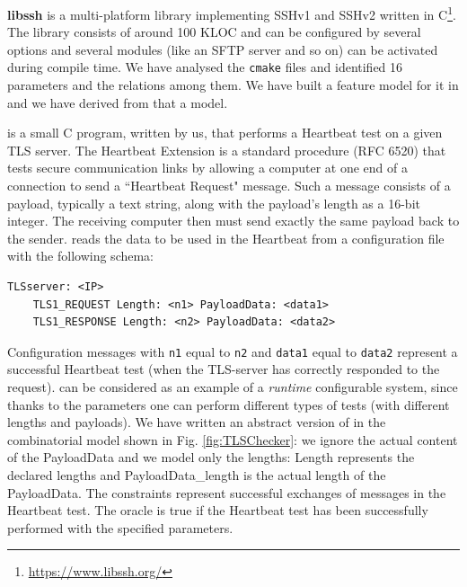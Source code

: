 \begin{tikzborder}{\cite{Gargantini16:validation}}
\begin{asparaenum}
		\item \textbf{libssh} is a multi-platform library implementing SSHv1 and SSHv2 written in C\footnote{\url{https://www.libssh.org/}}. The library consists of around 100 KLOC and can be configured by several options and several modules (like an SFTP server and so on) can be activated during compile time. We have analysed the \texttt{cmake} files and identified 16 parameters and the relations among them. We have built a feature model for it in \cite{icst2016} and we have derived from that a \citlab model.
		\item \textbf{\TLSChecker} is a small C program, written by us, that performs a Heartbeat test on a given TLS server. 
		The Heartbeat Extension is a standard procedure (RFC 6520) that tests secure communication links by allowing a computer at one end of a connection to send a ``Heartbeat Request" message. Such a message consists of a payload, typically a text string, along with the payload's length as a 16-bit integer. The receiving computer then must send exactly the same payload back to the sender. \TLSChecker reads the data to be used in the Heartbeat from a configuration file with the following schema:
		
		\begin{center}
			\begin{minipage}{.9\linewidth}%
				\begin{lstlisting}[frame=single,basicstyle={\scriptsize\ttfamily}]
	TLSserver: <IP>
	TLS1_REQUEST Length: <n1> PayloadData: <data1>
	TLS1_RESPONSE Length: <n2> PayloadData: <data2>
				\end{lstlisting}
			\end{minipage}
		\end{center}
		
		
		Configuration messages with \texttt{n1} equal to \texttt{n2} and  \texttt{data1} equal to  \texttt{data2} represent a successful  Heartbeat test (when the TLS-server has correctly responded to the request). \TLSChecker can be considered as an example of a \emph{runtime} configurable system, since thanks to the parameters one can perform different types of tests (with different lengths and payloads). We have written an abstract version of \TLSChecker in the combinatorial model shown in Fig. \ref{fig:TLSChecker}: we ignore the actual content of the PayloadData and we model only the lengths: \textsf{Length} represents the declared lengths and \textsf{PayloadData\_length} is the actual length of the PayloadData. The constraints represent successful exchanges of messages in the Heartbeat test. The oracle is true if the Heartbeat test has been successfully performed with the specified parameters.
		

\end{asparaenum}
\end{tikzborder}
